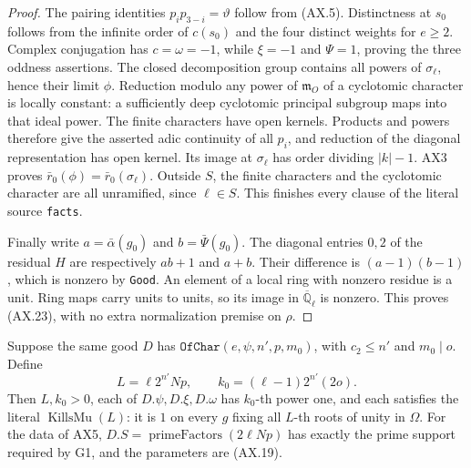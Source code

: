\begin{proof}
The pairing identities $p_i p_{3-i}=\vartheta$ follow from
(AX.5).  Distinctness at $s_0$ follows from the infinite order
of $c(s_0)$ and the four distinct weights for $e\ge2$.
Complex conjugation has $c=\omega=-1$, while $\xi=-1$ and
$\Psi=1$, proving the three oddness assertions.
The closed decomposition group contains all powers of
$\sigma_\ell$, hence their limit $\phi$.
Reduction modulo any power of $\mathfrak m_O$ of a cyclotomic
character is locally constant: a sufficiently deep cyclotomic
principal subgroup maps into that ideal power.  The finite
characters have open kernels.  Products and powers therefore
give the asserted adic continuity of all $p_i$, and reduction
of the diagonal representation has open kernel.
Its image at $\sigma_\ell$ has order dividing $|k|-1$.
AX3 proves $\bar r_0(\phi)=\bar r_0(\sigma_\ell)$.
Outside $S$, the finite characters and the cyclotomic character
are all unramified, since $\ell\in S$.  This finishes every
clause of the literal source \texttt{facts}.

Finally write $a=\bar\alpha(g_0)$ and $b=\bar\Psi(g_0)$.
The diagonal entries $0,2$ of the residual $H$ are respectively
$ab+1$ and $a+b$.  Their difference is $(a-1)(b-1)$, which is
nonzero by \texttt{Good}.  An element of a local ring with
nonzero residue is a unit.  Ring maps carry units to units,
so its image in $\overline{\mathbb Q}_\ell$ is nonzero.  This
proves (AX.23), with no extra normalization premise on $\rho$.
\end{proof}

\begin{proposition}
\label{prop:ax-level-integer}
Suppose the same good $D$ has
$\mathtt{OfChar}(e,\psi,n',p,m_0)$, with $c_2\le n'$ and $m_0\mid o$.
Define
\[
             L=\ell 2^{n'}Np,
             \qquad k_0=(\ell-1)2^{n'}(2o).
             \tag{AX.24}
\]
Then $L,k_0>0$, each of $D.\psi,D.\xi,D.\omega$ has $k_0$-th
power one, and each satisfies the literal
$\operatorname{KillsMu}(L)$: it is $1$ on every $g$ fixing all
$L$-th roots of unity in $\Omega$.  For the data of AX5,
$D.S=\operatorname{primeFactors}(2\ell Np)$ has exactly the
prime support required by G1, and the parameters are (AX.19).
\end{proposition}

